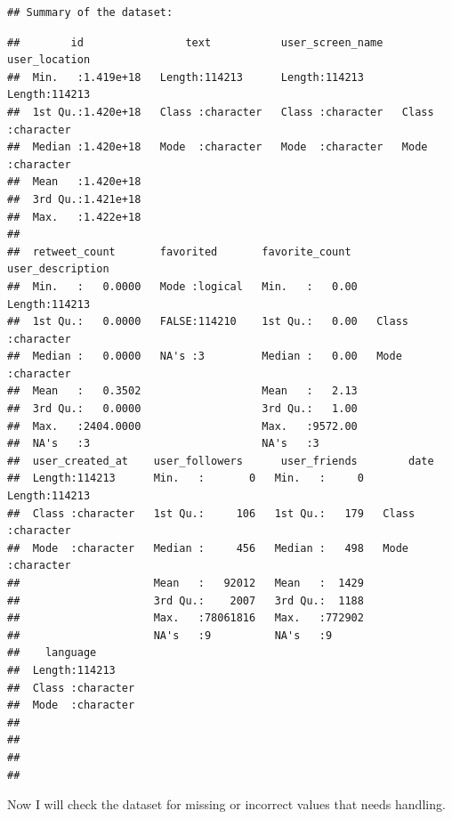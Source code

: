 \documentclass[
]{article}
\begin{document}
\begin{verbatim}
## Summary of the dataset:
\end{verbatim}

\begin{verbatim}
##        id                text           user_screen_name   user_location     
##  Min.   :1.419e+18   Length:114213      Length:114213      Length:114213     
##  1st Qu.:1.420e+18   Class :character   Class :character   Class :character  
##  Median :1.420e+18   Mode  :character   Mode  :character   Mode  :character  
##  Mean   :1.420e+18                                                           
##  3rd Qu.:1.421e+18                                                           
##  Max.   :1.422e+18                                                           
##                                                                              
##  retweet_count       favorited       favorite_count    user_description  
##  Min.   :   0.0000   Mode :logical   Min.   :   0.00   Length:114213     
##  1st Qu.:   0.0000   FALSE:114210    1st Qu.:   0.00   Class :character  
##  Median :   0.0000   NA's :3         Median :   0.00   Mode  :character  
##  Mean   :   0.3502                   Mean   :   2.13                     
##  3rd Qu.:   0.0000                   3rd Qu.:   1.00                     
##  Max.   :2404.0000                   Max.   :9572.00                     
##  NA's   :3                           NA's   :3                           
##  user_created_at    user_followers      user_friends        date          
##  Length:114213      Min.   :       0   Min.   :     0   Length:114213     
##  Class :character   1st Qu.:     106   1st Qu.:   179   Class :character  
##  Mode  :character   Median :     456   Median :   498   Mode  :character  
##                     Mean   :   92012   Mean   :  1429                     
##                     3rd Qu.:    2007   3rd Qu.:  1188                     
##                     Max.   :78061816   Max.   :772902                     
##                     NA's   :9          NA's   :9                          
##    language        
##  Length:114213     
##  Class :character  
##  Mode  :character  
##                    
##                    
##                    
## 
\end{verbatim}

Now I will check the dataset for missing or incorrect values that needs
handling.
\end{document}
